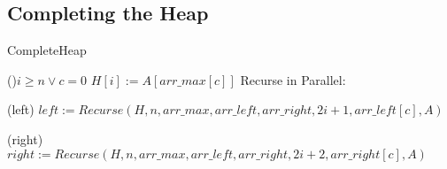 \documentclass[letterpaper, reqno, 11pt]{article}
\begin{document}
\subsection*{Completing the Heap}
\begin{algorithm}[H]
\caption{CompleteHeap}
\If(){$i\geq n\lor c=0$}
{
	\Return\;
}
$H[i]:=A[arr\_max[c]]$
Recurse in Parallel:
\begin{description}
	\item{(left)} $left:=Recurse(H, n, arr\_max, arr\_left, arr\_right,
			2i+1, arr\_left[c], A)$\;
	\item{(right)} $right:=Recurse(H, n, arr\_max, arr\_left, arr\_right,
			2i+2, arr\_right[c], A)$\;
\end{description}
\end{algorithm}

\pagebreak
\end{document}
